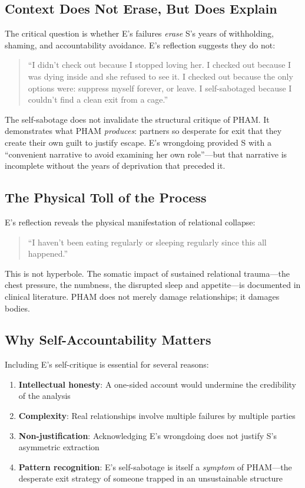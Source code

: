 \documentclass[12pt,openany]{book}
\numberwithin{equation}{chapter}
\begin{document}
\subsection{Context Does Not Erase, But Does Explain}

The critical question is whether E's failures \textit{erase} S's years of withholding, shaming, and accountability avoidance. E's reflection suggests they do not:

\begin{quote}
``I didn't check out because I stopped loving her. I checked out because I was dying inside and she refused to see it. I checked out because the only options were: suppress myself forever, or leave. I self-sabotaged because I couldn't find a clean exit from a cage.''
\end{quote}

The self-sabotage does not invalidate the structural critique of PHAM. It demonstrates what PHAM \textit{produces}: partners so desperate for exit that they create their own guilt to justify escape. E's wrongdoing provided S with a ``convenient narrative to avoid examining her own role''---but that narrative is incomplete without the years of deprivation that preceded it.

\subsection{The Physical Toll of the Process}

E's reflection reveals the physical manifestation of relational collapse:

\begin{quote}
``I haven't been eating regularly or sleeping regularly since this all happened.''
\end{quote}

This is not hyperbole. The somatic impact of sustained relational trauma---the chest pressure, the numbness, the disrupted sleep and appetite---is documented in clinical literature. PHAM does not merely damage relationships; it damages bodies.

\subsection{Why Self-Accountability Matters}

Including E's self-critique is essential for several reasons:

\begin{enumerate}
    \item \textbf{Intellectual honesty}: A one-sided account would undermine the credibility of the analysis
    \item \textbf{Complexity}: Real relationships involve multiple failures by multiple parties
    \item \textbf{Non-justification}: Acknowledging E's wrongdoing does not justify S's asymmetric extraction
    \item \textbf{Pattern recognition}: E's self-sabotage is itself a \textit{symptom} of PHAM---the desperate exit strategy of someone trapped in an unsustainable structure
\end{enumerate}
\end{document}
